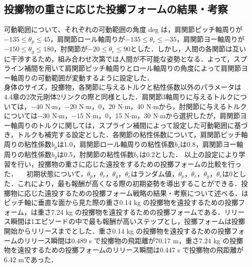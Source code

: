 \begin{small}
\subsection{投擲物の重さに応じた投擲フォームの結果・考察}
可動範囲について、それぞれの可動範囲の角度 deg は，肩関節ピッチ軸周りが$-135\leq\theta_{p}\leq45$，肩関節ロール軸周りが$-135\leq\theta_{r}\leq-35$，肩関節ヨー軸周りが$-150\leq\theta_{y}\leq180$，肘関節が$-20\leq\theta_{e}\leq90$とした．しかし，人間の各関節は互いに干渉するため，組み合わせ次第では人間が不可能な姿勢となる．よって，スプライン補間\cite{spline}を用いて肩関節ピッチ軸周りとロール軸周りの角度によって肩関節ヨー軸周りの可動範囲が変動するように設定した．\\
身体のサイズ，投擲物，各関節に与えるトルクと粘性係数以外のパラメータは4.4章の2次元剛体2リンクの際と同様とした．肩関節3軸周りに与えるトルクについては，$-40$ N$\cdot$m，$-20$ N$\cdot$m，0，20 N$\cdot$m，40 N$\cdot$mから，肘関節に与えるトルクについては$-30$ N$\cdot$m，$-15$ N$\cdot$m，0，15 N$\cdot$m，30 N$\cdot$mから選択したが，肩関節ヨー軸周りのトルクに関しては，スプライン補間によって設定した可動範囲に基づき，トルクも補完する設定とした．各関節の粘性係数について，肩関節ピッチ軸周りの粘性係数$b_{p}$は1.0，肩関節ロール軸周りの粘性係数$b_{r}$は0.8，肩関節ヨー軸周りの粘性係数$b_{y}$は0.5，肘関節の粘性係数$b_{e}$は0.2とした．
以上の設定により学習を行い，投擲物の重さに応じた遠投をするための投擲フォームの比較を行った．
　初期状態について，$\theta_{p}$，$\theta_{r}$，$\theta_{y}$，$\theta_{e}$はランダム値，$\dot{\theta}_{p}$，$\dot{\theta}_{r}$，$\dot{\theta}_{y}$，$\dot{\theta}_{e}$は0とした．これにより，最も報酬が高くなる際の初期姿勢を導出することができる．投擲物に応じた遠投するための投擲フォーム戦略の結果・考察について述べる．はピッチ軸に垂直な面から見た際の重さ0.14 kg の投擲物を遠投するための投擲フォーム，は重さ7.24 kg の投擲物を遠投するための投擲フォームである．リリース瞬間は1エピソードの中で最も報酬が高いステップとし，投擲フォームは投擲開始からリリースまでとした．重さ0.14 kg の投擲物を遠投するための投擲フォームのリリース瞬間は0.489 s で投擲物の飛距離が70.17 m，重さ7.24 kg の投擲物を遠投するための投擲フォームのリリース瞬間は0.447 s で投擲物の飛距離が6.42 mであった．

\end{small}
